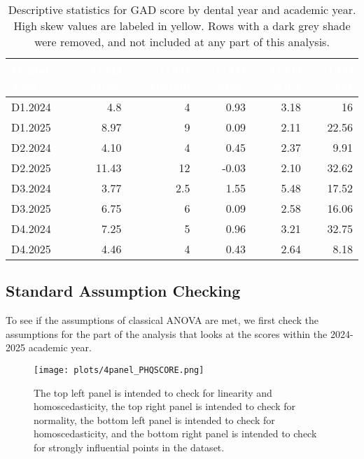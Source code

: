 \documentclass{article}
\begin{document}
\begin{table}[H]
\tiny
\centering
\tiny
\renewcommand{\arraystretch}{0.4}

\caption{Descriptive statistics for GAD score by dental year and academic year. High skew values are labeled in yellow. Rows with a dark grey shade were removed, and not included at any part of this analysis.}
\label{tab:gad_stats}

\begin{tabular}{|l|r|r|r|r|r|}
\hline
\rowcolor{black!80} 
\textcolor{white}{Dental Year} & \textcolor{white}{GAD Mean} & \textcolor{white}{GAD Median} & \textcolor{white}{GAD Skew} & \textcolor{white}{GAD Kurt} & \textcolor{white}{GAD Var} \\
\hline
D1.2024 & 4.8 & 4 & 0.93 & 3.18 & 16 \\
D1.2025 & 8.97 & 9 & 0.09 & 2.11 & 22.56 \\
\rowcolor{gray!50} D2.2024 & 4.10 & 4 & 0.45 & 2.37 & 9.91 \\
D2.2025 & 11.43 & 12 & -0.03 & 2.10 & 32.62 \\
D3.2024 & 3.77 & 2.5 & \cellcolor{yellow!50}1.55 & 5.48 & 17.52 \\
D3.2025 & 6.75 & 6 & 0.09 & 2.58 & 16.06 \\
\rowcolor{gray!50} D4.2024 & 7.25 & 5 & 0.96 & 3.21 & 32.75 \\
D4.2025 & 4.46 & 4 & 0.43 & 2.64 & 8.18 \\
\hline
\end{tabular}
\end{table}



\subsection{Standard Assumption Checking}

To see if the assumptions of classical ANOVA are met, we first check the assumptions for the part of the analysis that looks at the scores within the 2024-2025 academic year.

\begin{figure}[H]
    \centering
    \texttt{[image: plots/4panel\_PHQSCORE.png]}
    \caption{The top left panel is intended to check for linearity and homoscedasticity, the top right panel is intended to check for normality, the bottom left panel is intended to check for homoscedasticity, and the bottom right panel is intended to check for strongly influential points in the dataset.}
    \label{fig:phq_diag}
\end{figure}
\end{document}
